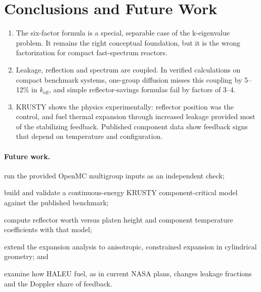 \documentclass[11pt,letterpaper]{article}
\newcommand{\keff}{k_\mathrm{eff}}
\begin{document}
\section{Conclusions and Future Work}
\label{sec:conclusions}

\begin{enumerate}
  \item The six-factor formula is a special, separable case of the k-eigenvalue problem. It remains the right conceptual foundation, but it is the wrong factorization for compact fast-spectrum reactors.
  \item Leakage, reflection and spectrum are coupled. In verified calculations on compact benchmark systems, one-group diffusion misses this coupling by 5--12\% in $\keff$, and simple reflector-savings formulas fail by factors of 3--4.
  \item KRUSTY shows the physics experimentally: reflector position was the control, and fuel thermal expansion through increased leakage provided most of the stabilizing feedback. Published component data show feedback signs that depend on temperature and configuration.
\end{enumerate}

\paragraph{Future work.}
\begin{enumerate*}[label=(\roman*)]
  \item run the provided OpenMC multigroup inputs as an independent check;
  \item build and validate a continuous-energy KRUSTY component-critical model against the published benchmark;
  \item compute reflector worth versus platen height and component temperature coefficients with that model;
  \item extend the expansion analysis to anisotropic, constrained expansion in cylindrical geometry; and
  \item examine how HALEU fuel, as in current NASA plans, changes leakage fractions and the Doppler share of feedback.
\end{enumerate*}




\appendix
\newpage
\end{document}
